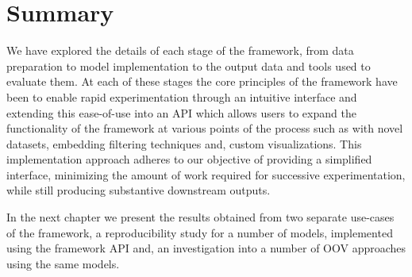 \documentclass[../../fyp.tex]{subfiles}
\begin{document}
\section{Summary}
We have explored the details of each stage of the framework, from data preparation to model implementation to the output data and tools used to evaluate them. At each of these stages the core principles of the framework have been to enable rapid experimentation through an intuitive interface and extending this ease-of-use into an API which allows users to expand the functionality of the framework at various points of the process such as with novel datasets, embedding filtering techniques and, custom visualizations. This implementation approach adheres to our objective of providing a simplified interface, minimizing the amount of work required for successive experimentation, while still producing substantive downstream outputs. 

In the next chapter we present the results obtained from two separate use-cases of the framework, a reproducibility study for a number of models, implemented using the framework API and, an investigation into a number of OOV approaches using the same models.  

\end{document}
